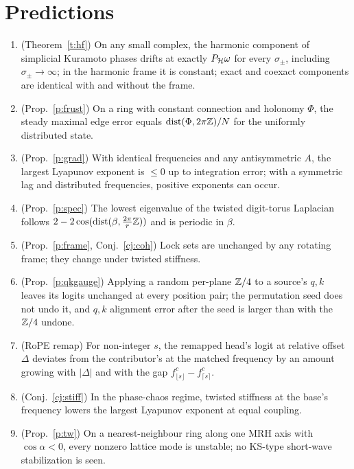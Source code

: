 \documentclass[10pt]{article}
\theoremstyle{definition}
\begin{document}
\section{Predictions}\label{s:pred}
\begin{enumerate}\itemsep1pt
\item[Q1] (Theorem~\ref{t:hf}) On any small complex, the harmonic component of simplicial Kuramoto phases drifts at exactly $P_\mathcal H\omega$ for every $\sigma_\pm$, including $\sigma_\pm\to\infty$; in the harmonic frame it is constant; exact and coexact components are identical with and without the frame.
\item[Q2] (Prop.~\ref{p:frust}) On a ring with constant connection and holonomy $\Phi$, the steady maximal edge error equals $\operatorname{dist}(\Phi,2\pi\mathbb Z)/N$ for the uniformly distributed state.
\item[Q3] (Prop.~\ref{p:grad}) With identical frequencies and any antisymmetric $A$, the largest Lyapunov exponent is $\le0$ up to integration error; with a symmetric lag and distributed frequencies, positive exponents can occur.
\item[Q4] (Prop.~\ref{p:spec}) The lowest eigenvalue of the twisted digit-torus Laplacian follows $2-2\cos(\operatorname{dist}(\beta,\frac{2\pi}{r}\mathbb Z))$ and is periodic in $\beta$.
\item[Q5] (Prop.~\ref{p:frame}, Conj.~\ref{cj:coh}) Lock sets are unchanged by any rotating frame; they change under twisted stiffness.
\item[Q6] (Prop.~\ref{p:qkgauge}) Applying a random per-plane $\mathbb Z/4$ to a source's $q,k$ leaves its logits unchanged at every position pair; the permutation seed does not undo it, and $q,k$ alignment error after the seed is larger than with the $\mathbb Z/4$ undone.
\item[Q7] (RoPE remap) For non-integer $s$, the remapped head's logit at relative offset $\Delta$ deviates from the contributor's at the matched frequency by an amount growing with $|\Delta|$ and with the gap $f^c_{\lfloor s\rfloor}-f^c_{\lceil s\rceil}$.
\item[Q8] (Conj.~\ref{cj:stiff}) In the phase-chaos regime, twisted stiffness at the base's frequency lowers the largest Lyapunov exponent at equal coupling.
\item[Q9] (Prop.~\ref{p:tw}) On a nearest-neighbour ring along one MRH axis with $\cos\alpha<0$, every nonzero lattice mode is unstable; no KS-type short-wave stabilization is seen.
\end{enumerate}
\end{document}
